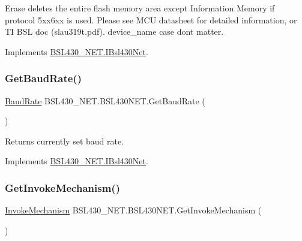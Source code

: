 Erase deletes the entire flash memory area except Information Memory if protocol 5xx6xx is used. Please see M\+CU datasheet for detailed information, or TI B\+SL doc (slau319t.\+pdf). device\+\_\+name case dont matter. 



Implements \mbox{\hyperlink{interface_b_s_l430___n_e_t_1_1_i_bsl430_net_a54980ac32c18ed1202db2c9ff4e38a7a}{B\+S\+L430\+\_\+\+N\+E\+T.\+I\+Bsl430\+Net}}.

\mbox{\label{class_b_s_l430___n_e_t_1_1_b_s_l430_n_e_t_aa2a47062b93eab1ff0ba09d7c0ff11c3}} 
\subsubsection{\texorpdfstring{GetBaudRate()}{GetBaudRate()}}
{\footnotesize\ttfamily \mbox{\hyperlink{namespace_b_s_l430___n_e_t_a8d30c263598635a481840944d38aeb70}{Baud\+Rate}} B\+S\+L430\+\_\+\+N\+E\+T.\+B\+S\+L430\+N\+E\+T.\+Get\+Baud\+Rate (\begin{DoxyParamCaption}{ }\end{DoxyParamCaption})}



Returns currently set baud rate. 



Implements \mbox{\hyperlink{interface_b_s_l430___n_e_t_1_1_i_bsl430_net_a96d263e6860582cd135b5d5ac90d792a}{B\+S\+L430\+\_\+\+N\+E\+T.\+I\+Bsl430\+Net}}.

\mbox{\label{class_b_s_l430___n_e_t_1_1_b_s_l430_n_e_t_aaf38a4fb21714699bbe2950108ae5c6d}} 
\subsubsection{\texorpdfstring{GetInvokeMechanism()}{GetInvokeMechanism()}}
{\footnotesize\ttfamily \mbox{\hyperlink{namespace_b_s_l430___n_e_t_a6571fdf0fbbc8408b8428f4d642c1305}{Invoke\+Mechanism}} B\+S\+L430\+\_\+\+N\+E\+T.\+B\+S\+L430\+N\+E\+T.\+Get\+Invoke\+Mechanism (\begin{DoxyParamCaption}{ }\end{DoxyParamCaption})}



